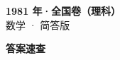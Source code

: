 \documentclass[zihao=-4, a4paper]{ctexart}
\begin{document}
\begin{center}
  {\Large\bfseries 1981 年·全国卷（理科）}\\[4pt]
  {\large 数学 · 简答版}
\end{center}
\medskip
{}

\clearpage
{}
\begin{center}{\Large\bfseries 答案速查}\end{center}
\medskip

\end{document}
